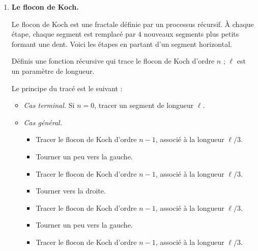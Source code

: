 \documentclass[11pt,class=report,crop=false]{standalone}
\begin{document}
\begin{activite}



\begin{enumerate}
  \item \textbf{Le flocon de Koch.}
  
  Le flocon de Koch est une fractale définie par un processus récursif.
  \`A chaque étape, chaque segment est remplacé par $4$ nouveaux segments plus petits formant une dent. Voici les étapes en partant d'un segment horizontal.
  
  \bigskip
  


   
   Définis une fonction récursive  qui trace le flocon de Koch d'ordre $n$ ;
   $\ell$ est un paramètre de longueur.
   
   Le principe du tracé est le suivant :
   \begin{itemize}
     \item \emph{Cas terminal.} Si $n=0$, tracer un segment de longueur $\ell$.
     
     \item \emph{Cas général.}
     \begin{itemize}  
       \item Tracer le flocon de Koch d'ordre $n-1$, associé à la longueur $\ell/3$.
       \item Tourner un peu vers la gauche.
       \item Tracer le flocon de Koch d'ordre $n-1$, associé à la longueur $\ell/3$.
       \item Tourner vers la droite.
       \item Tracer le flocon de Koch d'ordre $n-1$, associé à la longueur $\ell/3$.       
       \item Tourner un peu vers la gauche.
       \item Tracer le flocon de Koch d'ordre $n-1$, associé à la longueur $\ell/3$.
     \end{itemize}       
  \end{itemize}    
    

\end{enumerate}
\end{activite}
\end{document}
